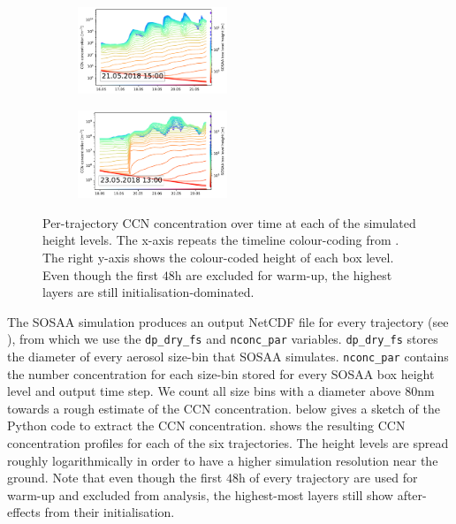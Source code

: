 \begin{figure}[H]
    \begin{subfigure}
        \centering
        \includegraphics[width=0.49\textwidth]{sosaa-data/figures/trajectories/trajectory-21.05.2018:15.00-ccn.pdf}
    \end{subfigure}
    \begin{subfigure}
        \centering
        \includegraphics[width=0.49\textwidth]{sosaa-data/figures/trajectories/trajectory-23.05.2018:13.00-ccn.pdf}
    \end{subfigure}

    \caption[CCN concentration of the six example trajectories]{Per-trajectory CCN concentration over time at each of the simulated height levels. The x-axis repeats the timeline colour-coding from . The right y-axis shows the colour-coded height of each box level. Even though the first $48\text{h}$ are excluded for warm-up, the highest layers are still initialisation-dominated.}
    \label{fig:six-trajectories-ccn}
\end{figure}

\noindent The SOSAA simulation produces an output NetCDF file \cite{netcdf-1989} for every trajectory (see ), from which we use the \texttt{dp\_dry\_fs} and \texttt{nconc\_par} variables. \texttt{dp\_dry\_fs} stores the diameter of every aerosol size-bin that SOSAA simulates. \texttt{nconc\_par} contains the number concentration for each size-bin stored for every SOSAA box height level and output time step. We count all size bins with a diameter above $80 \text{nm}$ \cite{ccn-size-2006} towards a rough estimate of the CCN concentration.  below gives a sketch of the Python code to extract the CCN concentration.  shows the resulting CCN concentration profiles for each of the six trajectories. The height levels are spread roughly logarithmically in order to have a higher simulation resolution near the ground. Note that even though the first $48 \text{h}$ of every trajectory are used for warm-up and excluded from analysis, the highest-most layers still show after-effects from their initialisation.

